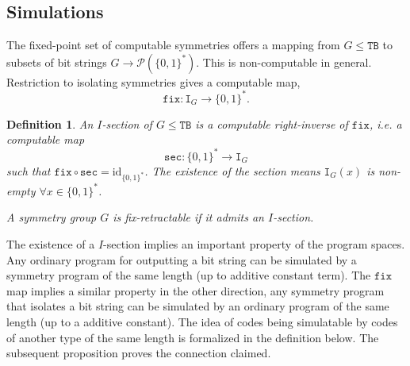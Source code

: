 \documentclass{article}
\newtheorem{definition}[theorem]{Definition}
\newcommand{\bin}{\{0,1\}^*} %
\newcommand{\TB}{\mathtt{TB}}
\newcommand{\I}{\mathtt{I}}
\newcommand{\fix}{\mathtt{fix}}
\newcommand{\s}{\mathtt{sec}}
\begin{document}
\subsection{Simulations}
The fixed-point set of computable symmetries offers a mapping from $G \leq \TB$ to subsets of bit strings $G \to \mathcal{P}(\bin)$. This is non-computable in general. Restriction to isolating symmetries gives a computable map,
\begin{equation}
    \fix: \I_G \to \bin.
\end{equation} 
\begin{definition}
    \label{def:fix-ret}
    An $I$-section of $G \leq \TB$ is a computable right-inverse of $\fix$, i.e. a computable map 
    \begin{equation}
        \s: \bin \to \I_G
    \end{equation}
    such that $\fix\circ\s = \text{id}_{\bin}$. The existence of the section means $\I_G(x)$ is non-empty $\forall x \in \bin$.

    A symmetry group $G$ is \emph{fix-retractable} if it admits an $I$-section. 
\end{definition}





The existence of a $I$-section implies an important property of the program spaces. Any ordinary program for outputting a bit string can be simulated by a symmetry program of the same length (up to additive constant term). The $\fix$ map implies a similar property in the other direction, any symmetry program that isolates a bit string can be simulated by an ordinary program of the same length (up to a additive constant). The idea of codes being simulatable by codes of another type of the same length is formalized in the definition below. The subsequent proposition proves the connection claimed. 
\end{document}
